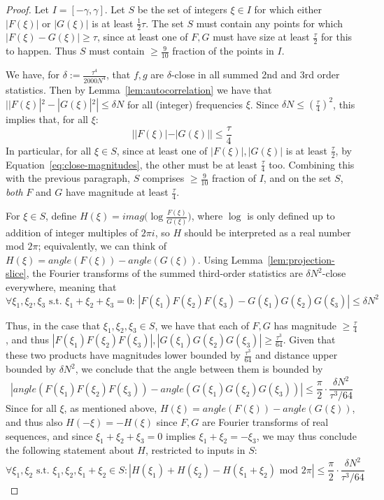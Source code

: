 \documentclass[11pt]{article}
\theoremstyle{plain}
\renewcommand{\mod}{\text{ mod }}
\begin{document}
\begin{proof}
    Let $I = [-\gamma,\gamma]$. Let $S$ be the set of integers $\xi\in I$ for which either $|F(\xi)|$ or $|G(\xi)|$ is at least $\frac{1}{2}\tau$. The set $S$ must contain any points for which $|F(\xi)-G(\xi)|\geq\tau$, since at least one of $F,G$ must have size at least $\frac{\tau}{2}$ for this to happen. Thus $S$ must contain $\geq\frac{9}{10}$ fraction of the points in $I$.

    We have, for $\delta:=\frac{\tau^4}{2000N^4}$, that $f,g$ are $\delta$-close in all summed 2nd and 3rd order statistics. Then by Lemma~\ref{lem:autocorrelation} we have that $||F(\xi)|^2-|G(\xi)|^2|\leq \delta N$ for all (integer) frequencies $\xi$. Since $\delta N\leq (\frac{\tau}{4})^2$, this implies that, for all $\xi$: \begin{equation}\label{eq:close-magnitudes}||F(\xi)|-|G(\xi)||\leq \frac{\tau}{4}\end{equation}
    In particular, for all $\xi \in S$, since at least one of $|F(\xi)|,|G(\xi)|$ is at least $\frac{\tau}{2}$, by Equation~\ref{eq:close-magnitudes}, the other must be at least $\frac{\tau}{4}$ too. Combining this with the previous paragraph, $S$ comprises $\geq\frac{9}{10}$ fraction of $I$, and on the set $S$, \emph{both} $F$ and $G$ have magnitude at least $\frac{\tau}{4}$.

    For $\xi \in S$, define $H(\xi) = imag\big(\log \frac{F(\xi)}{G(\xi)}\big)$, where $\log$ is only defined up to addition of integer multiples of $2\pi i$, so $H$ should be interpreted as a real number mod $2\pi$; equivalently, we can think of $H(\xi)=angle(F(\xi))-angle(G(\xi))$. Using Lemma~\ref{lem:projection-slice}, the Fourier transforms of the summed third-order statistics are $\delta N^2$-close everywhere, meaning that 
    \[\forall \xi_1,\xi_2,\xi_3\textrm{ s.t. }\xi_1+\xi_2+\xi_3=0:\,|F(\xi_1)F(\xi_2)F(\xi_3)-G(\xi_1)G(\xi_2)G(\xi_3)|\leq \delta N^2\]

    Thus, in the case that $\xi_1,\xi_2,\xi_3\in S$, we have that each of $F,G$ has magnitude $\geq \frac{\tau}{4}$, and thus $|F(\xi_1)F(\xi_2)F(\xi_3)|,|G(\xi_1)G(\xi_2)G(\xi_3)| \geq \frac{\tau^3}{64}$. Given that these two products have magnitudes lower bounded by $\frac{\tau^3}{64}$ and distance upper bounded by $\delta N^2$, we conclude that the angle between them is bounded by
    \[|angle(F(\xi_1)F(\xi_2)F(\xi_3))-angle(G(\xi_1)G(\xi_2)G(\xi_3))|\leq \frac{\pi}{2}\cdot\frac{\delta N^2}{\tau^3/64}\]
    Since for all $\xi$, as mentioned above, $H(\xi)=angle(F(\xi))-angle(G(\xi))$, and thus also $H(-\xi)=-H(\xi)$ since $F,G$ are Fourier transforms of real sequences, and since $\xi_1+\xi_2+\xi_3=0$ implies $\xi_1+\xi_2=-\xi_3$, we may thus conclude the following statement about $H$, restricted to inputs in $S$:
    \begin{equation}\label{eq:H-condition}
        \forall \xi_1,\xi_2\textrm{ s.t. } \xi_1,\xi_2,\xi_1+\xi_2\in S: |H(\xi_1)+H(\xi_2)-H(\xi_1+\xi_2) \mod 2\pi | \leq \frac{\pi}{2}\cdot\frac{\delta N^2}{\tau^3/64}
    \end{equation}


\end{proof}
\end{document}
